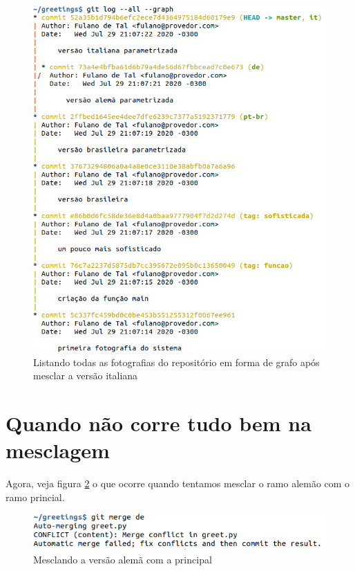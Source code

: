 \documentclass[a4paper]{book}
\begin{document}
\begin{figure}[!h]
\caption{Listando todas as fotografias do repositório em forma de grafo após mesclar a versão italiana}
\label{fig:52}
\centering
\includegraphics[scale=0.6,left]{"images/52-Listando todas as fotografias do repositório em forma de grafo após mesclar a versão italiana.png"}
\end{figure}

\newpage
\section{Quando não corre tudo bem na mesclagem}

Agora, veja figura \ref{fig:53} o que ocorre quando tentamos 
mesclar o ramo alemão com o ramo princial.

\begin{figure}[ht]
\caption{Mesclando a versão alemã com a principal}
\label{fig:53}
\centering
\includegraphics[scale=0.6,left]{"images/53-Mesclando a versão alemã com a principal.png"}
\end{figure}
\end{document}
